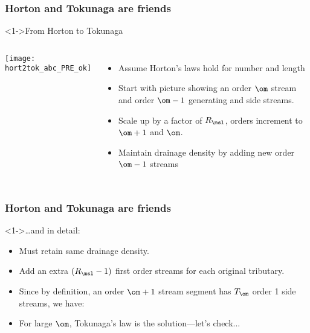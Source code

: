 \begin{frame}[label=]
  \frametitle{Horton and Tokunaga are friends}

  \begin{block}<1->{From Horton to Tokunaga\cite{dodds1999a}}
    \begin{columns}
      \texttt{[image: hort2tok\_abc\_PRE\_ok]}
      \begin{itemize}
      \item<2-> Assume Horton's laws hold for number and length
      \item<3-> Start with picture showing an order $\om$ stream
        and order $\om-1$ generating and side streams.
      \item<4-> Scale up by a factor of $R_\msl$, orders increment
        to $\om+1$ and $\om$.
      \item<5-> Maintain drainage density by adding new order $\om-1$ streams
      \end{itemize}
    \end{columns}
      
  \end{block}

\end{frame}

\begin{frame}[label=]
  \frametitle{Horton and Tokunaga are friends}

  \begin{block}<1->{\ldots and in detail:}
    \begin{itemize}
    \item<1-> Must retain same drainage density.
    \item<2-> Add an extra $(R_\msl-1)$ first order streams
      for each original tributary.
    \item<3-> Since by definition, an order $\om+1$ stream segment
      has $T_{\om}$ order 1 side streams, we have: 
    \item<5->
      For large $\om$, Tokunaga's law is the solution---let's check...
    \end{itemize}

  \end{block}

\end{frame}

